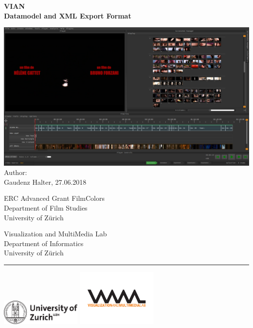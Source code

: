 \documentclass[11pt, a4paper,oneside,chapterprefix=false]{scrbook}
\begin{document}
\frontmatter
\begin{titlepage}
	\setlength{\parindent}{0cm}
	\addtolength{\textheight}{1.0cm}

	\vspace{0.5cm}
	\Huge
	{\textbf \textsf{VIAN\\ \huge Datamodel and XML Export Format}}

	\vfill\vfill\vfill
	\vfill
	\includegraphics*[width=1.0\textwidth]{figures/vian_02.png}
	\vfill \vfill \vfill
	\large
	Author:\\
	Gaudenz Halter, 27.06.2018\\
	
	
	
	


	\begin{minipage}[b]{0.5\textwidth}
	ERC Advanced Grant FilmColors\\
	Department of Film Studies \\
	University of Z{\"u}rich
	\end{minipage}
	\begin{minipage}[b]{0.5\textwidth} \raggedleft
	Visualization and MultiMedia Lab \\
	Department of Informatics \\
	University of Z{\"u}rich
	\end{minipage}

	\vfill
	\hrule
	\vspace{0.5cm}
	\includegraphics*[width=0.3\textwidth]{figures/uzh_logo} \hfill
	\includegraphics*[width=0.3\textwidth]{figures/vmml_logo}

\end{titlepage}
\end{document}
